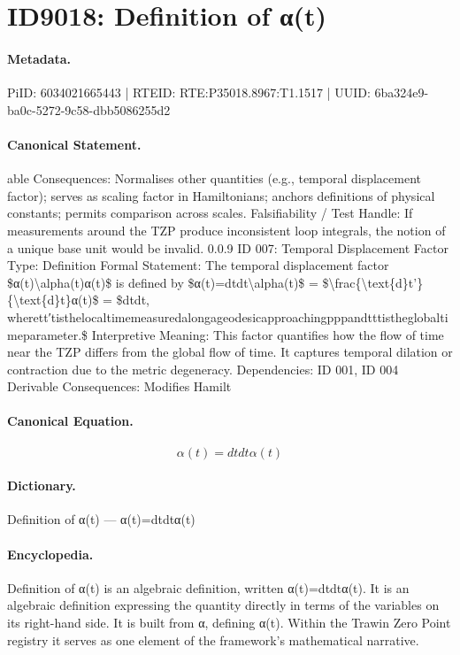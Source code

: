 \section*{ID9018: Definition of α(t)}
\paragraph{Metadata.}
PiID: 6034021665443 | RTEID: RTE:P35018.8967:T1.1517 | UUID: 6ba324e9-ba0c-5272-9c58-dbb5086255d2

\paragraph{Canonical Statement.}
able Consequences: Normalises other quantities (e.g., temporal displacement factor); serves as scaling factor in Hamiltonians; anchors definitions of physical constants; permits comparison across scales. Falsifiability / Test Handle: If measurements around the TZP produce inconsistent loop integrals, the notion of a unique base unit would be invalid. 0.0.9 ID 007: Temporal Displacement Factor Type: Definition Formal Statement: The temporal displacement factor \$α(t)\textbackslash{}alpha(t)α(t)\$ is defined by \$α(t)=dtdt\textbackslash{}alpha(t)\$ = \$\textbackslash{}frac\{\textbackslash{}text\{d\}t’\}\{\textbackslash{}text\{d\}t\}α(t)\$ = \$dtdt, wherett′tisthelocaltimemeasuredalongageodesicapproachingpppandtttistheglobaltimeparameter.\$ Interpretive Meaning: This factor quantifies how the flow of time near the TZP differs from the global flow of time. It captures temporal dilation or contraction due to the metric degeneracy. Dependencies: ID 001, ID 004 Derivable Consequences: Modifies Hamilt

\paragraph{Canonical Equation.}
\[
α(t)=dtdt\alpha(t)
\]

\paragraph{Dictionary.}
Definition of α(t) — α(t)=dtdtα(t)

\paragraph{Encyclopedia.}
Definition of α(t) is an algebraic definition, written α(t)=dtdtα(t). It is an algebraic definition expressing the quantity directly in terms of the variables on its right-hand side. It is built from α, defining α(t). Within the Trawin Zero Point registry it serves as one element of the framework's mathematical narrative.
